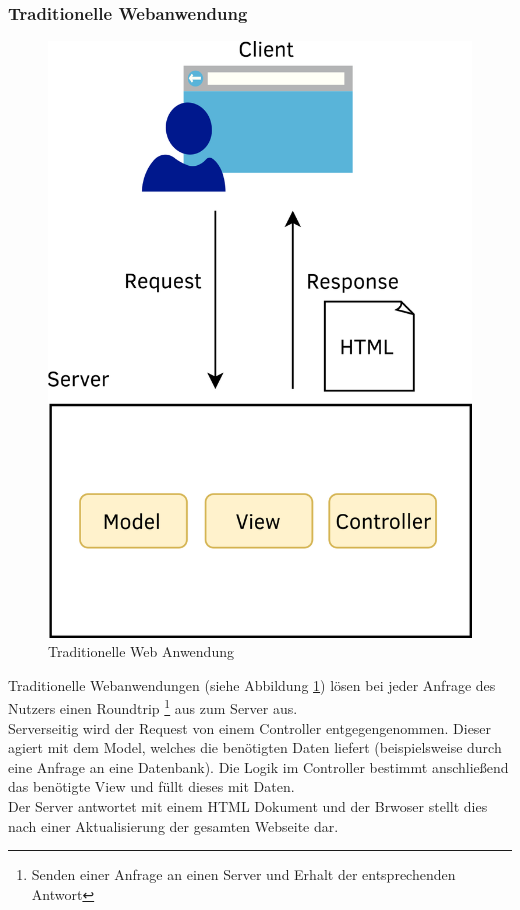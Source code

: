 \subsubsection{Traditionelle Webanwendung}
\begin{figure}
  \begin{center}
    \includegraphics[scale=1]{images/traditonal_web_app.png}
  \end{center}
  \caption{Traditionelle Web Anwendung}
  \label{fig:tradweb}
\end{figure}
Traditionelle Webanwendungen (siehe Abbildung \ref{fig:tradweb}) lösen bei jeder Anfrage des Nutzers einen Roundtrip \footnote{Senden einer Anfrage an einen Server und Erhalt der entsprechenden Antwort} aus zum Server aus.\\
Serverseitig wird der Request von einem Controller entgegengenommen. Dieser agiert mit dem Model, welches die benötigten Daten liefert (beispielsweise durch eine Anfrage an eine Datenbank). Die Logik im Controller bestimmt anschließend das benötigte View und füllt dieses mit Daten.\\
Der Server antwortet mit einem \ac{HTML} Dokument und der Brwoser stellt dies nach einer Aktualisierung der gesamten Webseite dar.
